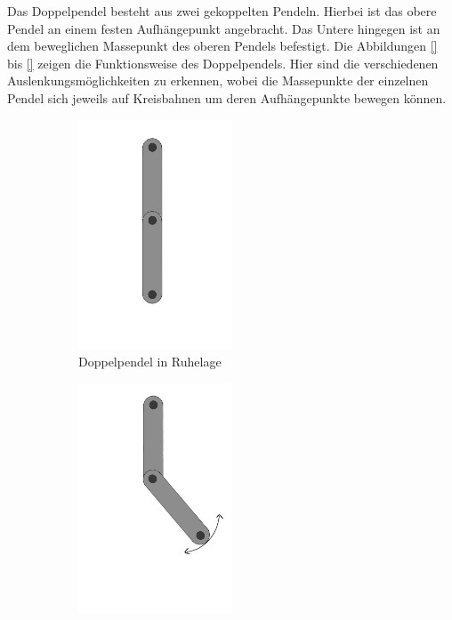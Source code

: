 \documentclass[11pt,a4paper,titlepage, ngerman]{article}
\begin{document}
		Das Doppelpendel besteht aus zwei gekoppelten Pendeln. Hierbei ist das obere Pendel an einem festen Aufhängepunkt angebracht. Das Untere  hingegen ist an dem beweglichen Massepunkt des oberen Pendels befestigt. Die Abbildungen \ref{} bis \ref{} zeigen die Funktionsweise des Doppelpendels. Hier sind die verschiedenen Auslenkungsmöglichkeiten zu erkennen, wobei die Massepunkte der einzelnen Pendel sich jeweils auf Kreisbahnen um deren Aufhängepunkte bewegen können.	
		\begin{figure}[ht]
			\begin{subfigure}{0.5\textwidth}
				\centering
				\includegraphics[width=0.5\textwidth]{Doppelpendel_Ruhelage.png}
				\caption{Doppelpendel in Ruhelage}
				\label{abb:DP_Ruhe}	
			\end{subfigure}
			\begin{subfigure}{0.5\textwidth}
				\centering
				\includegraphics[width=0.5\textwidth]{Doppelpendel_Auslenkung_P2.png}

\end{subfigure}
\end{figure}
\end{document}
